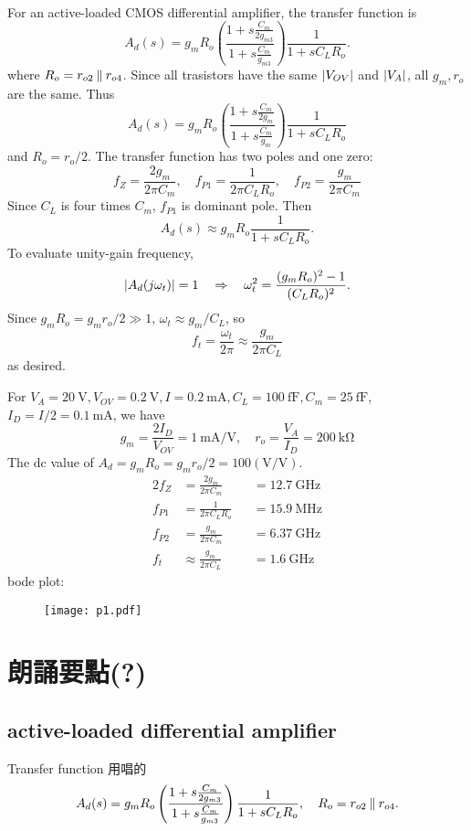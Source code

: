 \documentclass[12pt, a4paper]{article}
\begin{document}
\Ans \\
For an active-loaded CMOS differential amplifier, the transfer function is
\[
  A_d(s) = g_mR_o\left(\frac{1+s\frac{C_m}{2g_{m3}}}{1+s\frac{C_m}{g_{m3}}}\right)
      \frac{1}{1+sC_LR_o}.
\]
where $R_o = r_{o2} \mathbin{\|} r_{o4}$.
Since all trasistors have the same $\lvert V_{OV}\rvert$ and $\lvert V_A\rvert$, all
$g_m, r_o$ are the same. Thus
\[
  A_d(s) = g_mR_o\left(\frac{1+s\frac{C_m}{2g_m}}{1+s\frac{C_m}{g_m}}\right)
      \frac{1}{1+sC_LR_o}
\]
and $R_o = r_o / 2$. The transfer function has two poles and one zero:
\[
  f_Z = \frac{2g_m}{2\pi C_m}, \quad
  f_{P1} = \frac{1}{2\pi C_LR_o}, \quad
  f_{P2} = \frac{g_m}{2\pi C_m}
\]
Since $C_L$ is four times $C_m$, $f_{P1}$ is dominant pole. Then
\[
  A_d(s) \approx g_mR_o \frac{1}{1+sC_LR_o}.
\]
To evaluate unity-gain frequency,
\[
  \lvert A_d(j\omega_t)\rvert = 1 \quad \Rightarrow \quad
  \omega_t^2 = \frac{(g_mR_o)^2 - 1}{(C_LR_o)^2}.
\]
Since $g_mR_o = g_mr_o/2 \gg 1$, $\omega_t \approx g_m/C_L$, so
\[
  f_t = \frac{\omega_t}{2\pi} \approx \frac{g_m}{2\pi C_L}
\]
as desired.

For $V_A=\SI{20}{\V}, V_{OV}=\SI{0.2}{\V}, I=\SI{0.2}{\mA},
C_L=\SI{100}{\fF},C_m=\SI{25}{\fF}$, $I_D = I/2=\SI{0.1}{\mA}$, we have
\[
  g_m = \frac{2I_D}{V_{OV}} = \SI{1}{\mA/\V}, \quad
  r_o = \frac{V_A}{I_D} = \SI{200}{\kohm}
\]
The dc value of $A_d = g_mR_o = g_mr_o/2 = 100(\si{\V/\V})$.
\begin{alignat*}{2}
  f_Z &= \frac{2g_m}{2\pi C_m} & &= \SI{12.7}{\GHz} \\
  f_{P1} &= \frac{1}{2\pi C_LR_o} & &= \SI{15.9}{\MHz} \\
  f_{P2} &= \frac{g_m}{2\pi C_m} & &= \SI{6.37}{\GHz} \\
  f_t &\approx \frac{g_m}{2\pi C_L} & &= \SI{1.6}{\GHz}
\end{alignat*}
bode plot:
\begin{figure}[H]
  \centering
  \texttt{[image: p1.pdf]}
\end{figure}

\section{朗誦要點(?)}
\subsection{active-loaded differential amplifier}
Transfer function 用唱的
\[
  A_d(s) = g_mR_o\left(\frac{1+s\frac{C_m}{2g_{m3}}}{1+s\frac{C_m}{g_{m3}}}\right)
  \frac{1}{1+sC_LR_o}, \quad R_o = r_{o2} \mathbin{\|} r_{o4}.
\]
\end{document}
